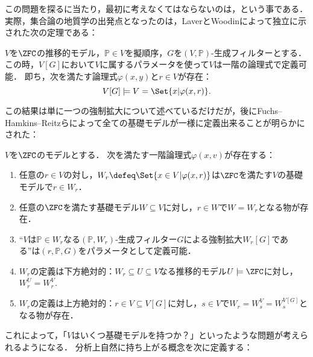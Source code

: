 \documentclass[a4j,leqno]{ltjsarticle}
\renewcommand{\emph}[1]{\textgt{\textsf{#1}}}
\theoremstyle{nonumberplain}
\begin{document}
この問題を探るに当たり，最初に考えなくてはならないのは，\emph{基礎モデルは定義可能か？}という事である．
実際，集合論の地質学の出発点となったのは，LaverとWoodinによって独立に示された次の定理である：
\begin{theorem}
 $V$を$\ZFC$の推移的モデル，$\mathbb{P} \in V$を擬順序，$G$を$(V, \mathbb{P})$-生成フィルターとする．
 この時，$V[G]$において$V$に属するパラメータを使って$V$は一階の論理式で定義可能．
 即ち，次を満たす論理式$\varphi(x, y)$と$r \in V$が存在：
 \[
  V[G] \models V = \Set{x | \varphi(x, r)}.
 \]
\end{theorem}
この結果は単に一つの強制拡大について述べているだけだが，後にFuchs--Hamkins--Reitzらによって全ての基礎モデルが一様に定義出来ることが明らかにされた：
\begin{theorem}
 $V$を$\ZFC$のモデルとする．
 次を満たす一階論理式$\varphi(x, v)$が存在する：
 \begin{enumerate}
  \item 任意の$r \in V$の対し，$W_r \defeq \Set{x \in V | \varphi(x, r)}$は$\ZFC$を満たす$V$の基礎モデルで$r \in W_r$．
  \item 任意の$\ZFC$を満たす基礎モデル$W \subseteq V$に対し，$r \in W$で$W = W_r$となる物が存在．
  \item ``$V$は$\mathbb{P} \in W_r$なる$(\mathbb{P}, W_r)$-生成フィルター$G$による強制拡大$W_r[G]$である''は$(r, \mathbb{P}, G)$をパラメータとして定義可能．
  \item $W_r$の定義は下方絶対的：$W_r \subseteq U \subseteq V$なる推移的モデル$U \models \ZFC$に対し，$W_r^U = W_r^V$.
  \item $W_r$の定義は上方絶対的：$r \in V \subseteq V[G]$に対し，$s \in V$で$W_r = W_s^V = W_s^{V[G]}$となる物が存在．
 \end{enumerate}
\end{theorem}
これによって，「$V$はいくつ基礎モデルを持つか？」といったような問題が考えられるようになる．
分析上自然に持ち上がる概念を次に定義する：
\end{document}
